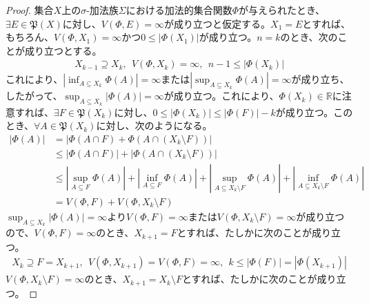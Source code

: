 \documentclass[dvipdfmx]{jsarticle}
\begin{document}
\begin{proof}
集合$X$上の$\sigma$-加法族$\varSigma$における加法的集合関数$\varPhi$が与えられたとき、$\exists E \in \mathfrak{P}(X)$に対し、$V(\varPhi,E) = \infty$が成り立つと仮定する。$X_{1} = E$とすれば、もちろん、$V\left( \varPhi,X_{1} \right) = \infty$かつ$0 \leq \left| \varPhi\left( X_{1} \right) \right|$が成り立つ。$n = k$のとき、次のことが成り立つとする。
\begin{align*}
X_{k - 1} \supseteq X_{k},\ \ V\left( \varPhi,X_{k} \right) = \infty,\ \ n - 1 \leq \left| \varPhi\left( X_{k} \right) \right|
\end{align*}
これにより、$\left| \inf_{A \subseteq X_{k}}{\varPhi(A)} \right| = \infty$または$\left| \sup_{A \subseteq X_{k}}{\varPhi(A)} \right| = \infty$が成り立ち、したがって、$\sup_{A \subseteq X_{k}}\left| \varPhi(A) \right| = \infty$が成り立つ。これにより、$\varPhi\left( X_{k} \right) \in \mathbb{R}$に注意すれば、$\exists F \in \mathfrak{P}\left( X_{k} \right)$に対し、$0 \leq \left| \varPhi\left( X_{k} \right) \right| \leq \left| \varPhi(F) \right| - k$が成り立つ。このとき、$\forall A \in \mathfrak{P}\left( X_{k} \right)$に対し、次のようになる。
\begin{align*}
\left| \varPhi(A) \right| &= \left| \varPhi(A \cap F) + \varPhi\left( A \cap \left( X_{k} \setminus F \right) \right) \right|\\
&\leq \left| \varPhi(A \cap F) \right| + \left| \varPhi\left( A \cap \left( X_{k} \setminus F \right) \right) \right|\\
&\leq \left| \sup_{A \subseteq F}{\varPhi(A)} \right| + \left| \inf_{A \subseteq F}{\varPhi(A)} \right| + \left| \sup_{A \subseteq X_{k} \setminus F}{\varPhi(A)} \right| + \left| \inf_{A \subseteq X_{k} \setminus F}{\varPhi(A)} \right|\\
&= V(\varPhi,F) + V\left( \varPhi,X_{k} \setminus F \right)
\end{align*}
$\sup_{A \subseteq X_{k}}\left| \varPhi(A) \right| = \infty$より$V(\varPhi,F) = \infty$または$V\left( \varPhi,X_{k} \setminus F \right) = \infty$が成り立つので、$V(\varPhi,F) = \infty$のとき、$X_{k + 1} = F$とすれば、たしかに次のことが成り立つ。
\begin{align*}
X_{k} \supseteq F = X_{k + 1},\ \ V\left( \varPhi,X_{k + 1} \right) = V(\varPhi,F) = \infty,\ \ k \leq \left| \varPhi(F) \right| = \left| \varPhi\left( X_{k + 1} \right) \right|
\end{align*}
$V\left( \varPhi,X_{k} \setminus F \right) = \infty$のとき、$X_{k + 1} = X_{k} \setminus F$とすれば、たしかに次のことが成り立つ。

\end{proof}
\end{document}
